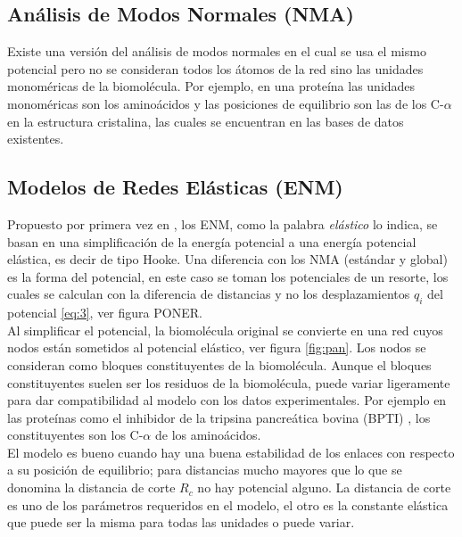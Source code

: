 \subsection{An\'{a}lisis de Modos Normales (NMA)}
 Existe una versi\'{o}n del an\'{a}lisis de modos normales en el cual se usa el mismo potencial pero no se consideran todos los \'{a}tomos de la red sino las unidades monom\'{e}ricas de la biomol\'{e}cula. Por ejemplo, en una prote\'{i}na las unidades monom\'{e}ricas son los amino\'{a}cidos y las posiciones de equilibrio son las de los C-$\alpha$ en la estructura cristalina, las cuales se encuentran en las bases de datos existentes.
\subsection{Modelos de Redes El\'{a}sticas (ENM)}
Propuesto por primera vez en \cite{Tirion1996}, los ENM, como la palabra \textit{el\'{a}stico} lo indica, se basan en una simplificaci\'{o}n de la energ\'{i}a potencial a una energ\'{i}a potencial el\'{a}stica, es decir de tipo Hooke.  Una diferencia con los NMA (est\'{a}ndar y global) es la forma del potencial, en este caso se toman los potenciales de un resorte, los cuales se calculan con la diferencia de distancias y no los desplazamientos $q_i$ del potencial \eqref{eq:3}, ver figura PONER. \\

Al simplificar el potencial, la biomol\'{e}cula original se convierte en una red cuyos nodos est\'{a}n sometidos al potencial el\'{a}stico, ver figura \ref{fig:pan}. Los nodos se consideran como bloques constituyentes de la biomol\'{e}cula. Aunque el bloques constituyentes suelen ser los residuos de la biomol\'{e}cula, puede variar ligeramente para dar compatibilidad al modelo con los datos experimentales. Por ejemplo en las prote\'{i}nas como el 
inhibidor de la tripsina pancreática bovina (BPTI) \cite{Gur2013}, los constituyentes son los C-$\alpha$ de los amino\'{a}cidos.\\

El modelo es bueno cuando hay una buena estabilidad de los enlaces con respecto a su posici\'{o}n de equilibrio; para distancias mucho mayores que lo que se donomina la distancia de corte $R_c$ no hay potencial alguno. La distancia de corte es uno de los par\'{a}metros requeridos en el modelo, el otro es la constante el\'{a}stica que puede ser la misma para todas las unidades o puede variar.\\

